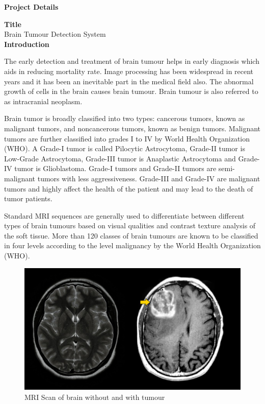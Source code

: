 \begin{center}
\begin{Large}
{\bf Project Details}
\end{Large} 
\end{center}
{\bf \Large Title}\\
Brain Tumour Detection System\\
{\bf \Large Introduction}\par
The early detection and treatment of brain tumour helps in early diagnosis which aids in reducing mortality rate. Image processing has been widespread in recent years and it has been an inevitable part in the medical field also. The abnormal growth of cells in the brain causes brain tumour. Brain tumour is also referred to as intracranial neoplasm. \par
Brain tumor is broadly classified into two types: cancerous tumors, known as malignant tumors, and noncancerous tumors, known as benign tumors. Malignant tumors are further classified into grades I to IV by World Health Organization (WHO). A Grade-I tumor is called Pilocytic Astrocytoma, Grade-II tumor is Low-Grade Astrocytoma, Grade-III tumor is Anaplastic Astrocytoma and Grade-IV tumor is Glioblastoma. Grade-I tumors and Grade-II tumors are semi-malignant tumors with less aggressiveness. Grade-III and Grade-IV are malignant tumors and highly affect the health of the patient and may lead to the death of tumor patients.\par
Standard MRI sequences are generally used to differentiate between different types of brain tumours based on visual qualities and contrast texture analysis of the soft tissue. More than 120 classes of brain tumours are known to be classified in four levels according to the level malignancy by the World Health Organization (WHO).\par
\begin{figure}[H]
  \includegraphics[scale=0.2]{mri.png}
  \caption{MRI Scan of brain without and with tumour} \label{fig:ishan}
\end{figure}
